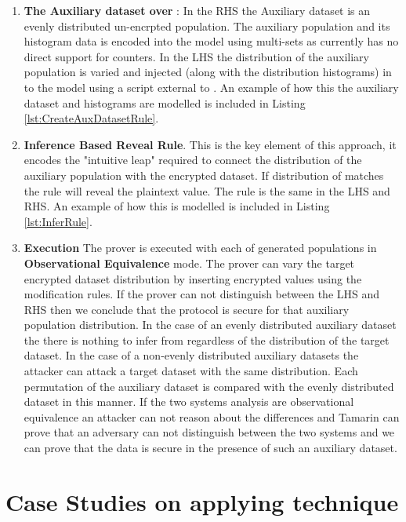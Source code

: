 \documentclass[journal]{IEEEtran}
\begin{document}
\begin{enumerate}[label=(\Alph*)]
\item \textbf{The Auxiliary dataset \aux{} over \auxSpace}:
In the RHS the Auxiliary dataset \auxsecure{} is an evenly distributed un-encrpted population.  The auxiliary population and its histogram data is encoded into the model using \tamarin{} multi-sets as \tamarin{} currently has no direct support for counters. 
In the LHS the distribution of the auxiliary population is varied and injected (along with the distribution histograms) in to the model using a script external to \tamarin{}.
An example of how this the auxiliary dataset and histograms are modelled is included in Listing \ref{lst:CreateAuxDatasetRule}.
\item\textbf{ Inference Based Reveal Rule}. This is the key element of this approach, it encodes the "intuitive leap" required to connect the distribution of the auxiliary population with the encrypted dataset.   If  distribution of \aux{} matches \enc{} the rule will reveal the plaintext value. The rule is the same in the LHS and RHS. An example of how this is modelled is included in Listing \ref{lst:InferRule}.
\item \textbf{Execution}
The \tamarin{} prover is executed with each of generated \aux{} populations in \textbf{Observational Equivalence} mode. The prover can vary the target encrypted dataset distribution by inserting encrypted values using the modification rules. If the prover can not distinguish between the LHS and RHS then we conclude that the protocol is secure for that auxiliary population distribution.  In the case of an evenly distributed auxiliary dataset the there is nothing to infer from regardless of the distribution of the target dataset. In the case of a non-evenly distributed auxiliary datasets the attacker can attack a target dataset with the same distribution. Each permutation of the auxiliary dataset is compared with the evenly distributed dataset in this manner. If the two systems analysis are observational equivalence an attacker can not reason about the differences and Tamarin can prove that an adversary can not distinguish between the two systems and we can prove that the data is secure in the presence of such an auxiliary dataset.

\end{enumerate}


 
\section{Case Studies on applying technique}
\end{document}
